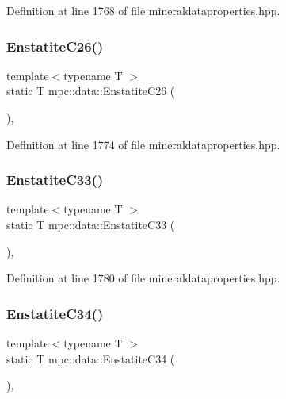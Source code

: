 Definition at line 1768 of file mineraldataproperties.\+hpp.

\mbox{\label{namespacempc_1_1data_af56427575ea2ac9d5c1377d2593b4608}} 
\subsubsection{\texorpdfstring{Enstatite\+C26()}{EnstatiteC26()}}
{\footnotesize\ttfamily template$<$typename T $>$ \\
static T mpc\+::data\+::\+Enstatite\+C26 (\begin{DoxyParamCaption}{ }\end{DoxyParamCaption})\hspace{0.3cm}{\ttfamily [inline]}, {\ttfamily [static]}}



Definition at line 1774 of file mineraldataproperties.\+hpp.

\mbox{\label{namespacempc_1_1data_af73260a39912a7def11bb8f3861e4428}} 
\subsubsection{\texorpdfstring{Enstatite\+C33()}{EnstatiteC33()}}
{\footnotesize\ttfamily template$<$typename T $>$ \\
static T mpc\+::data\+::\+Enstatite\+C33 (\begin{DoxyParamCaption}{ }\end{DoxyParamCaption})\hspace{0.3cm}{\ttfamily [inline]}, {\ttfamily [static]}}



Definition at line 1780 of file mineraldataproperties.\+hpp.

\mbox{\label{namespacempc_1_1data_a99824307f06e163bddfd1ce49e3b383f}} 
\subsubsection{\texorpdfstring{Enstatite\+C34()}{EnstatiteC34()}}
{\footnotesize\ttfamily template$<$typename T $>$ \\
static T mpc\+::data\+::\+Enstatite\+C34 (\begin{DoxyParamCaption}{ }\end{DoxyParamCaption})\hspace{0.3cm}{\ttfamily [inline]}, {\ttfamily [static]}}



